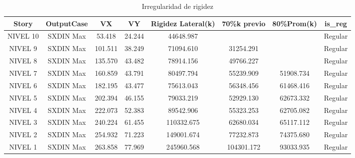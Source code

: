 \documentclass{article}%
\begin{document}
\begin{table}[h!]%
\centering%
\caption{Irregularidad de rigidez}%
\begin{tabular}{cccccccc}
\toprule
Story & OutputCase & VX & VY & Rigidez Lateral(k) & 70\%k previo & 80\%Prom(k) & is\_reg \\
\midrule
NIVEL 10 & SXDIN Max & 53.418 & 24.244 & 44648.987 &  &  & Regular \\
NIVEL 9 & SXDIN Max & 101.511 & 38.249 & 71094.610 & 31254.291 &  & Regular \\
NIVEL 8 & SXDIN Max & 135.570 & 43.482 & 78914.156 & 49766.227 &  & Regular \\
NIVEL 7 & SXDIN Max & 160.859 & 43.791 & 80497.794 & 55239.909 & 51908.734 & Regular \\
NIVEL 6 & SXDIN Max & 182.195 & 43.477 & 75613.043 & 56348.456 & 61468.416 & Regular \\
NIVEL 5 & SXDIN Max & 202.394 & 46.155 & 79033.219 & 52929.130 & 62673.332 & Regular \\
NIVEL 4 & SXDIN Max & 222.073 & 52.383 & 89542.906 & 55323.253 & 62705.082 & Regular \\
NIVEL 3 & SXDIN Max & 240.224 & 61.455 & 110332.675 & 62680.034 & 65117.112 & Regular \\
NIVEL 2 & SXDIN Max & 254.932 & 71.223 & 149001.674 & 77232.873 & 74375.680 & Regular \\
NIVEL 1 & SXDIN Max & 263.858 & 77.969 & 245960.568 & 104301.172 & 93033.935 & Regular \\
\bottomrule
\end{tabular}
%
\end{table}

%
\end{document}
